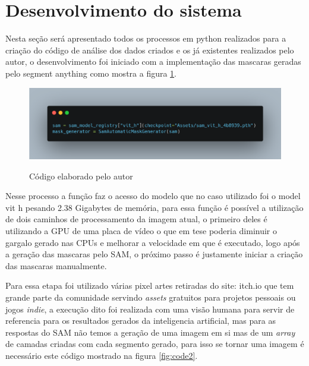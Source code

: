 \section{Desenvolvimento do sistema}

Nesta seção será apresentado todos os processos em python realizados para a criação do código de análise dos dados criados e os já existentes realizados pelo autor, o desenvolvimento foi iniciado com a implementação das mascaras geradas pelo segment anything como mostra a figura \ref{fig:code1}.

\FloatBarrier
\begin{figure}[ht]
    \caption{Código elaborado pelo autor}
    \centering
    \includegraphics[scale=0.25]{imagens/code_part_one.png}
    \label{fig:code1}
\end{figure}
\FloatBarrier

Nesse processo a função faz o acesso do modelo que no caso utilizado foi o model vit h pesando 2.38 Gigabytes de memória, para essa função é possível a utilização de dois caminhos de processamento da imagem atual, o primeiro deles é utilizando a GPU de uma placa de vídeo o que em tese poderia diminuir o gargalo gerado nas CPUs e melhorar a velocidade em que é executado, logo após a geração das mascaras pelo SAM, o próximo passo é justamente iniciar a criação das mascaras manualmente.


Para essa etapa foi utilizado várias pixel artes retiradas do site: itch.io que tem grande parte da comunidade servindo \textit{assets} gratuitos para projetos pessoais ou jogos \textit{indie}, a execução dito foi realizada com uma visão humana para servir de referencia para os resultados gerados da inteligencia artificial, mas para as respostas do SAM não temos a geração de uma imagem em si mas de um \textit{array} de camadas criadas com cada segmento gerado, para isso se tornar uma imagem é necessário este código mostrado na figura \ref{fig:code2}.

